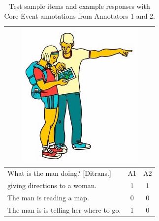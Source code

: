 \documentclass[11pt,a4paper]{article}
\begin{document}
\begin{table}[t!]
\begin{center}
\begin{tabular}{|l|c|c|}
\multicolumn{3}{|c|}{\includegraphics[width=0.5\columnwidth]{figures/I28.jpg}} \\
\hline
What is the man doing? [Ditrans.] & A1 & A2 \\
\hline
giving directions to a woman. & 1 & 1 \\
\hline
The man is reading a map. & 0 & 0 \\
\hline
The man is is telling her where to go. & 1 & 0 \\
\hline
\end{tabular}
\caption{\label{tab:test-sample-items} Test sample items and example responses with Core Event annotations from Annotators 1 and 2.}
\end{center}
\end{table}
\end{document}
